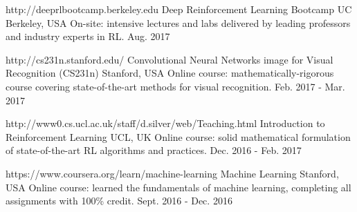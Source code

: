 
\begin{cvmoocs}

  \cvmooc
  	{http://deeprlbootcamp.berkeley.edu}
    {Deep Reinforcement Learning Bootcamp} %
    {UC Berkeley, USA} %
    {On-site: intensive lectures and labs delivered by leading professors and industry experts in RL.} %
    {Aug. 2017} %


  \cvmooc
  	{http://cs231n.stanford.edu/}
    {Convolutional Neural Networks image for Visual Recognition (CS231n)} %
    {Stanford, USA} %
    {Online course: mathematically-rigorous course covering state-of-the-art methods for visual recognition.} %
    {Feb. 2017 - Mar. 2017} %

  \cvmooc
  	{http://www0.cs.ucl.ac.uk/staff/d.silver/web/Teaching.html}
    {Introduction to Reinforcement Learning} %
    {UCL, UK} %
    {Online course: solid mathematical formulation of state-of-the-art RL algorithms and practices.} %
    {Dec. 2016 - Feb. 2017} %

  \cvmooc
    {https://www.coursera.org/learn/machine-learning}
    {Machine Learning} %
    {Stanford, USA} %
    {Online course: learned the fundamentals of machine learning, completing all assignments with 100\% credit.} %
    {Sept. 2016 - Dec. 2016} %


\end{cvmoocs}